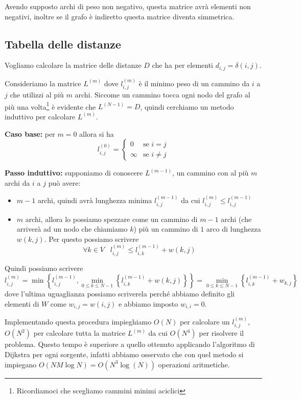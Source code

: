 \documentclass[a4paper,10pt]{amsbook}
\theoremstyle{plain}
\theoremstyle{definition}
\theoremstyle{remark}
\newcommand{\set}[1]{\left\{#1\right\}}
\newcommand{\pa}[1]{\left(#1\right)}
\begin{document}
Avendo supposto archi di peso non negativo, questa matrice avrà
elementi non negativi, inoltre se il grafo è indiretto questa matrice
diventa simmetrica.

\subsection{Tabella delle distanze}

Vogliamo calcolare la matrice delle distanze $D$ che ha per elementi
$d_{i,j} = \delta(i,j)$.

Consideriamo la matrice $L^{(m)}$ dove $l^{(m)}_{i,j}$ è il minimo
peso di un cammino da $i$ a $j$ che utilizzi al più $m$ archi. Siccome
un cammino tocca ogni nodo del grafo al pi\`u una
volta\footnote{Ricordiamoci che scegliamo cammini minimi aciclici} \`e
evidente che $L^{(N-1)} = D$, quindi cerchiamo un metodo induttivo per
calcolare $L^{(m)}$.

\textbf{Caso base:} per $m=0$ allora si ha
\[ l^{(0)} _{i,j} = \left\{
  \begin{matrix}
    0 & \text{se } i = j\\
    \infty & \text{se } i \neq j
  \end{matrix}
  \right.
\]

\textbf{Passo induttivo:} supponiamo di conoscere $L^{(m-1)}$, un
cammino con al più $m$ archi da $i$ a $j$ può avere:
\begin{itemize}
\item $m-1$ archi, quindi avrà lunghezza minima $l^{(m-1)}
  _{i,j}$ da cui $l^{(m)}_{i,j} \le l^{(m-1)} _{i,j}$
\item $m$ archi, allora lo possiamo spezzare come un cammino di
  $m-1$ archi (che arriverà ad un nodo che chiamiamo $k$) più un
  cammino di $1$ arco di lunghezza $w\pa{k,j}$. Per questo possiamo
  scrivere 
  \[ \forall k \in V\;\;\; l^{(m)}_{i,j} \le l^{(m-1)} _{i,k} + w\pa{
    k,j } \]
\end{itemize}
Quindi possiamo scrivere
\[ l^{(m)}_{i,j} = \min\set{ l^{(m-1)} _{i,j} , \min _{0\le k\le N-1}
  \set{ l^{(m-1)} _{i,k} + w\pa{k,j}} } = \min _{0\le k\le N-1} \set{
  l^{(m-1)} _{i,k} + w_{k,j}} \]
dove l'ultima uguaglianza possiamo scriverela perché abbiamo definito
gli elementi di $W$ come $w_{i,j} = w\pa{i,j}$ e abbiamo imposto
$w_{i,i} = 0$.

Implementando questa procedura impieghiamo $O(N)$ per calcolare un
$l^{(m)}_{i,j}$, $O(N^2)$ per calcolare tutta la matrice $L^{(m)}$ da
cui $O(N^4)$ per risolvere il problema. Questo tempo è superiore a
quello ottenuto applicando l'algoritmo di Dijkstra per ogni sorgente,
infatti abbiamo osservato che con quel metodo si impiegano $O(NM\log
N) = O( N^3 \log (N) )$ operazioni aritmetiche.
\end{document}
